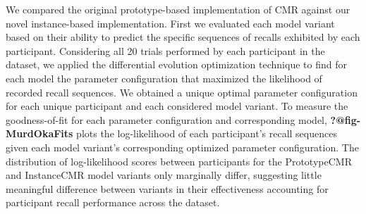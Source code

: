 \documentclass[
  letterpaper,
]{article}
\begin{document}
We compared the original prototype-based implementation of CMR against
our novel instance-based implementation. First we evaluated each model
variant based on their ability to predict the specific sequences of
recalls exhibited by each participant. Considering all 20 trials
performed by each participant in the dataset, we applied the
differential evolution optimization technique to find for each model the
parameter configuration that maximized the likelihood of recorded recall
sequences. We obtained a unique optimal parameter configuration for each
unique participant and each considered model variant. To measure the
goodness-of-fit for each parameter configuration and corresponding
model, \textbf{?@fig-MurdOkaFits} plots the log-likelihood of each
participant's recall sequences given each model variant's corresponding
optimized parameter configuration. The distribution of log-likelihood
scores between participants for the PrototypeCMR and InstanceCMR model
variants only marginally differ, suggesting little meaningful difference
between variants in their effectiveness accounting for participant
recall performance across the dataset.
\end{document}
